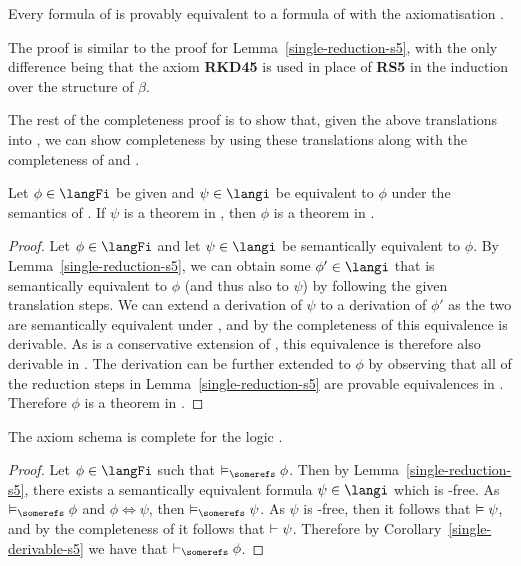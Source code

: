 \pagebreak
\begin{lemma}\label{single-reduction-kd45}
Every formula of \langFi{} is provably equivalent to a formula of \langi{} with
the axiomatisation \axiomKDiF{}.
\end{lemma}

The proof is similar to the proof for Lemma~\ref{single-reduction-s5}, with the
only difference being that the axiom {\bf RKD45} is used in place of {\bf RS5}
in the induction over the structure of $\beta$.

The rest of the completeness proof is to show that, given the above translations
into \langi{}, we can show completeness by using these translations along with
the completeness of \logicSi{} and \logicKDi{}.

\begin{corollary}\label{single-derivable-s5}
Let $\phi \in \langFi$ be given and $\psi \in \langi$ be equivalent to $\phi$
under the semantics of \logicSiF{}.  If $\psi$ is a theorem in \logicSi{}, then
$\phi$ is a theorem in \axiomSiF{}.
\end{corollary}

\begin{proof}
Let $\phi \in \langFi$ and let $\psi \in \langi$ be semantically equivalent to
$\phi$. By Lemma~\ref{single-reduction-s5}, we can obtain some $\phi' \in \langi$
that is semantically equivalent to $\phi$ (and thus also to $\psi$) by following
the given translation steps. We can extend a derivation of $\psi$ to a
derivation of $\phi'$ as the two are semantically equivalent under \logicSi{}, and by
the completeness of \logicSi{} this equivalence is derivable. As \axiomSiF{} is a
conservative extension of \logicSi{}, this equivalence is therefore also derivable
in \axiomSiF{}. The derivation can be further extended to $\phi$ by observing that all
of the reduction steps in Lemma~\ref{single-reduction-s5} are provable equivalences
in \axiomSiF{}. Therefore $\phi$ is a theorem in \axiomSiF{}.
\end{proof}

\begin{lemma}\label{single-complete-s5}
The axiom schema \axiomSiF{} is complete for the logic \logicSiF{}.
\end{lemma}

\begin{proof}
Let $\phi \in \langFi$ such that $\entails_\somerefs \phi$. Then by
Lemma~\ref{single-reduction-s5}, there exists a semantically equivalent formula
$\psi \in \langi$ which is \somerefs-free. As $\entails_\somerefs \phi$ and
$\phi \iff \psi$, then $\entails_\somerefs \psi$. As $\psi$ is
\somerefs-free, then it follows that $\vDash \psi$, and by the
completeness of \axiomSiF{} it follows that $\vdash \psi$.
Therefore by Corollary~\ref{single-derivable-s5} we have that $\proves_\somerefs
\phi$.
\end{proof}

